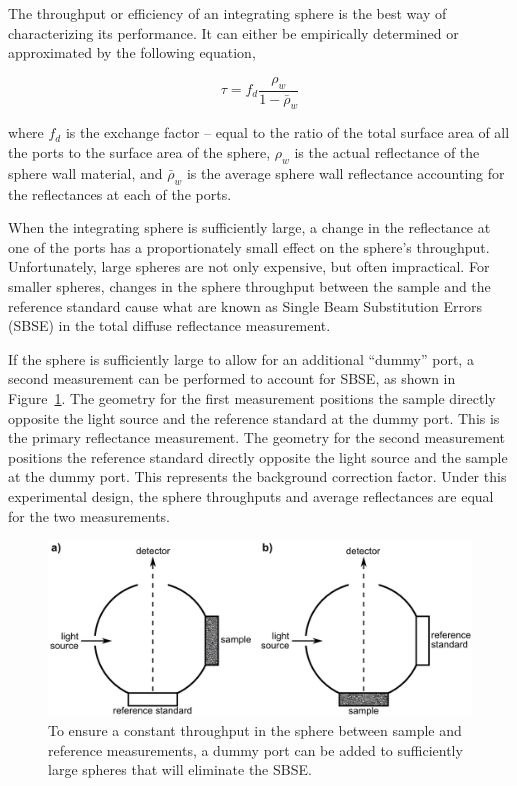 The throughput or efficiency of an integrating sphere is the best way of characterizing its performance. It can either be empirically determined or approximated by the following equation,

\begin{equation}
\tau = f_d \frac{\rho_w}{1-\bar{\rho}_w}
\end{equation}

\noindent where $f_d$ is the exchange factor -- equal to the ratio of the total surface area of all the ports to the surface area of the sphere, $\rho_w$ is the actual reflectance of the sphere wall material, and $\bar{\rho}_w$ is the average sphere wall reflectance accounting for the reflectances at each of the ports.

When the integrating sphere is sufficiently large, a change in the reflectance at one of the ports has a proportionately small effect on the sphere's throughput. Unfortunately, large spheres are not only expensive, but often impractical. For smaller spheres, changes in the sphere throughput between the sample and the reference standard cause what are known as Single Beam Substitution Errors (SBSE) in the total diffuse reflectance measurement.

If the sphere is sufficiently large to allow for an additional ``dummy'' port, a second measurement can be performed to account for SBSE, as shown in Figure~\ref{fig:intro-is_compar}.\cite{Labspherec} The geometry for the first measurement positions the sample directly opposite the light source and the reference standard at the dummy port. This is the primary reflectance measurement. The geometry for the second measurement positions the reference standard directly opposite the light source and the sample at the dummy port. This represents the background correction factor. Under this experimental design, the sphere throughputs and average reflectances are equal for the two measurements.

\begin{figure}
	\centering \includegraphics[width=1.0\textwidth]{figures/intro-is_compar.png}
	\caption[The comparison method for measuring sample reflectance]{\label{fig:intro-is_compar}To ensure a constant throughput in the sphere between sample and reference measurements, a dummy port can be added to sufficiently large spheres that will eliminate the SBSE.}
\end{figure}

